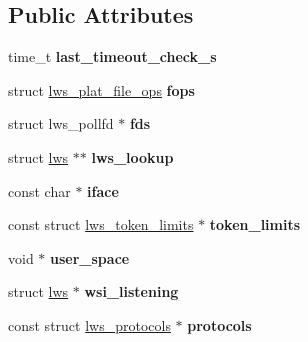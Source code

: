 \subsection*{Public Attributes}
\begin{DoxyCompactItemize}
\item 
\mbox{\label{structlws__context_a2890e921102b6288bf09649af8d7ef78}} 
time\+\_\+t {\bfseries last\+\_\+timeout\+\_\+check\+\_\+s}
\item 
\mbox{\label{structlws__context_a307c156fa16ac60c90f00358a9ea62e6}} 
struct \hyperlink{structlws__plat__file__ops}{lws\+\_\+plat\+\_\+file\+\_\+ops} {\bfseries fops}
\item 
\mbox{\label{structlws__context_abe7c95ffc389a1cdc386ffa134a5bbea}} 
struct lws\+\_\+pollfd $\ast$ {\bfseries fds}
\item 
\mbox{\label{structlws__context_afefbac6ec2e73618735b7b3532c9949c}} 
struct \hyperlink{structlws}{lws} $\ast$$\ast$ {\bfseries lws\+\_\+lookup}
\item 
\mbox{\label{structlws__context_a0370e1203c5ac1647e584d9c11032d66}} 
const char $\ast$ {\bfseries iface}
\item 
\mbox{\label{structlws__context_a3e73fc7701386f2bf5c85bf11f4168a4}} 
const struct \hyperlink{structlws__token__limits}{lws\+\_\+token\+\_\+limits} $\ast$ {\bfseries token\+\_\+limits}
\item 
\mbox{\label{structlws__context_ab0a9ca9186ddd83377defd60882db290}} 
void $\ast$ {\bfseries user\+\_\+space}
\item 
\mbox{\label{structlws__context_a32cb5b42a393e20b065f0232653db217}} 
struct \hyperlink{structlws}{lws} $\ast$ {\bfseries wsi\+\_\+listening}
\item 
\mbox{\label{structlws__context_a1d8bc031eafa833ac3e36bd4580a1f9a}} 
const struct \hyperlink{structlws__protocols}{lws\+\_\+protocols} $\ast$ {\bfseries protocols}
\item 
\mbox{\label{structlws__context_ae0c3e47f93b533e67e1076a637291253}} 
$$
\end{DoxyCompactItemize}
